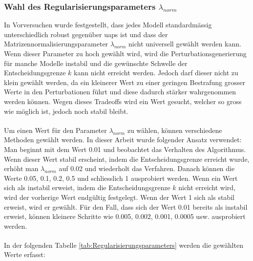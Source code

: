 \subsubsection{Wahl des Regularisierungsparameters $\lambda_{norm}$} \label{chap:wahl des Regularisierungsparameters}
In Vorversuchen wurde festgestellt, dass jedes Modell standardmässig unterschiedlich robust gegenüber \acrshort{uap}s ist und dass der Matrizennormalisierungsparameter $\lambda_{norm}$ nicht universell gewählt werden kann. Wenn dieser Parameter zu hoch gewählt wird, wird die Perturbationsgenerierung für manche Modelle instabil und die gewünschte Schwelle der Entscheidungsgrenze $k$ kann nicht erreicht werden. Jedoch darf dieser nicht zu klein gewählt werden, da ein kleinerer Wert zu einer geringen Bestrafung grosser Werte in den Perturbationen führt und diese dadurch stärker wahrgenommen werden können. Wegen dieses Tradeoffs wird ein Wert gesucht, welcher so gross wie möglich ist, jedoch noch stabil bleibt.
\\
\\
Um einen Wert für den Parameter $\lambda_{norm}$ zu wählen, können verschiedene Methoden gewählt werden. In dieser Arbeit wurde folgender Ansatz verwendet: Man beginnt mit dem Wert 0.01 und beobachtet das Verhalten des Algorithmus. Wenn dieser Wert stabil erscheint, indem die Entscheidungsgrenze erreicht wurde, erhöht man $\lambda_{norm}$ auf 0.02 und wiederholt das Verfahren. Danach können die Werte 0.05, 0.1, 0.2, 0.5 und schliesslich 1 ausprobiert werden. Wenn ein Wert sich als instabil erweist, indem die Entscheidungsgrenze $k$ nicht erreicht wird, wird der vorherige Wert endgültig festgelegt. Wenn der Wert 1 sich als stabil erweist, wird er gewählt. Für den Fall, dass sich der Wert 0.01 bereits als instabil erweist, können kleinere Schritte wie 0.005, 0.002, 0.001, 0.0005 usw. ausprobiert werden.
\\
\\
In der folgenden Tabelle \ref{tab:Regularisierungsparameters} werden die gewählten Werte erfasst:


